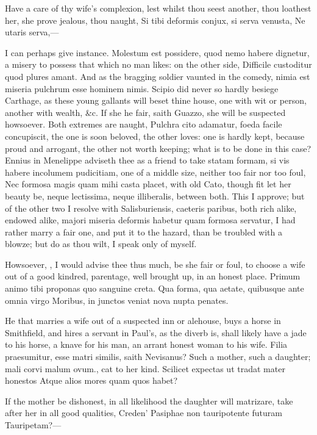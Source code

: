 {Have a care of thy wife's complexion, lest whilst thou seest another,
thou loathest her, she prove jealous, thou naught,
Si tibi deformis conjux, si serva venusta,
Ne utaris serva,---

I can perhaps give instance. Molestum est possidere, quod nemo habere
dignetur, a misery to possess that which no man likes: on the other
side, Difficile custoditur quod plures amant. And as the bragging
soldier vaunted in the comedy, nimia est miseria pulchrum esse hominem
nimis. Scipio did never so hardly besiege Carthage, as these young
gallants will beset thine house, one with wit or person, another with
wealth, \&c. If she he fair, saith Guazzo, she will be suspected
howsoever. Both extremes are naught, Pulchra cito adamatur, foeda
facile concupiscit, the one is soon beloved, the other loves: one is
hardly kept, because proud and arrogant, the other not worth keeping;
what is to be done in this case? Ennius in Menelippe adviseth thee as a
friend to take statam formam, si vis habere incolumem pudicitiam, one
of a middle size, neither too fair nor too foul, Nec formosa
magis quam mihi casta placet, with old Cato, though fit let her beauty
be, neque lectissima, neque illiberalis, between both. This I approve;
but of the other two I resolve with Salisburiensis, caeteris paribus,
both rich alike, endowed alike, majori miseria deformis habetur quam
formosa servatur, I had rather marry a fair one, and put it to the
hazard, than be troubled with a blowze; but do as thou wilt, I speak
only of myself.

Howsoever, , I would advise thee thus much, be she
fair or foul, to choose a wife out of a good kindred, parentage, well
brought up, in an honest place.
Primum animo tibi proponas quo sanguine creta.
Qua forma, qua aetate, quibusque ante omnia virgo
Moribus, in junctos veniat nova nupta penates.

He that marries a wife out of a suspected inn or alehouse, buys a horse
in Smithfield, and hires a servant in Paul's, as the diverb is, shall
likely have a jade to his horse, a knave for his man, an arrant honest
woman to his wife. Filia praesumitur, esse matri similis, saith
Nevisanus? Such a mother, such a daughter; mali corvi malum
ovum., cat to her kind.
Scilicet expectas ut tradat mater honestos
Atque alios mores quam quos habet?

If the mother be dishonest, in all likelihood the daughter will
matrizare, take after her in all good qualities,
Creden' Pasiphae non tauripotente futuram
Tauripetam?---

}
